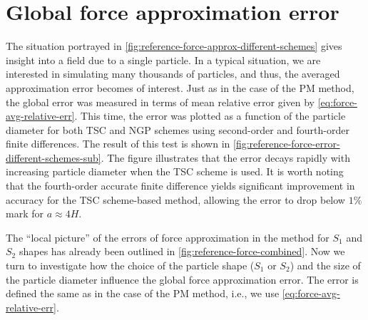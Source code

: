 \section{Global force approximation error}
The situation portrayed in \autoref{fig:reference-force-approx-different-schemes} gives insight into a field due to a single particle.
In a typical situation, we are interested in simulating many thousands of particles, and thus, the averaged approximation error becomes of interest.
Just as in the case of the PM method, the global error was measured in terms of mean relative error given by \autoref{eq:force-avg-relative-err}.
This time, the error was plotted as a function of the particle diameter for both TSC and NGP schemes using second-order and fourth-order finite differences.
The result of this test is shown in \autoref{fig:reference-force-error-different-schemes-sub}.
The figure illustrates that the error decays rapidly with increasing particle diameter when the TSC scheme is used.
It is worth noting that the fourth-order accurate finite difference yields significant improvement in accuracy for the TSC scheme-based \PThreeM{} method, allowing the error to drop below $1\%$ mark for $a \approx 4H$.

The ``local picture'' of the errors of force approximation in the \PThreeM{} method for $S_1$ and $S_2$ shapes has already been outlined in \autoref{fig:reference-force-combined}.
Now we turn to investigate how the choice of the particle shape ($S_1$ or $S_2$) and the size of the particle diameter influence the global force approximation error.
The error is defined the same as in the case of the PM method, i.e., we use \autoref{eq:force-avg-relative-err}.

